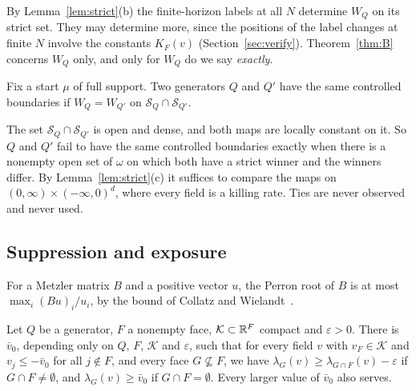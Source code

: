 By Lemma~\ref{lem:strict}(b) the finite-horizon labels at all $N$ determine $W_Q$ on its strict
set. They may determine more, since the positions of the label changes at finite $N$ involve the
constants $K_F(v)$ (Section~\ref{sec:verify}). Theorem~\ref{thm:B} concerns $W_Q$ only, and only
for $W_Q$ do we say \emph{exactly}.

\begin{definition}\label{def:controlled}
Fix a start $\mu$ of full support. Two generators $Q$ and $Q'$ have the same controlled
boundaries if $W_Q=W_{Q'}$ on $\mathcal S_Q\cap\mathcal S_{Q'}$.
\end{definition}

The set $\mathcal S_Q\cap\mathcal S_{Q'}$ is open and dense, and both maps are locally constant on
it. So $Q$ and $Q'$ fail to have the same controlled boundaries exactly when there is a nonempty
open set of $\omega$ on which both have a strict winner and the winners differ. By
Lemma~\ref{lem:strict}(c) it suffices to compare the maps on $(0,\infty)\times(-\infty,0)^d$,
where every field is a killing rate. Ties are never observed and never used.

\subsection{Suppression and exposure}\label{sec:exposure}

For a Metzler matrix $B$ and a positive vector $u$, the Perron root of $B$ is at most
$\max_i(Bu)_i/u_i$, by the bound of Collatz and Wielandt~\cite{bermanplemmons1994}.

\begin{lemma}[suppression]\label{lem:suppression-nr}
Let $Q$ be a generator, $F$ a nonempty face, $\mathcal K\subset\mathbb{R}^F$ compact and $\varepsilon>0$.
There is $\bar v_0$, depending only on $Q$, $F$, $\mathcal K$ and $\varepsilon$, such that for every
field $v$ with $v_F\in\mathcal K$ and $v_j\le-\bar v_0$ for all $j\notin F$, and every face
$G\not\subseteq F$, we have $\lambda_G(v)\ge\lambda_{G\cap F}(v)-\varepsilon$ if
$G\cap F\ne\emptyset$, and $\lambda_G(v)\ge\bar v_0$ if $G\cap F=\emptyset$. Every larger value of
$\bar v_0$ also serves.
\end{lemma}

